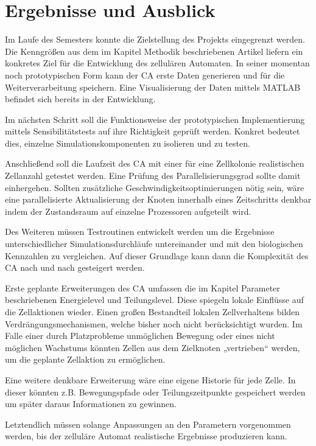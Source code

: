 \documentclass[11pt,a4paper,pointlessnumbers]{scrreprt}  %
\begin{document}
\chapter{Ergebnisse und Ausblick}
Im Laufe des Semesters konnte die Zielstellung des Projekts eingegrenzt werden. Die Kenngrößen aus dem im Kapitel Methodik beschriebenen Artikel liefern ein konkretes Ziel für die Entwicklung des zellulären Automaten. In seiner momentan noch prototypischen Form kann der CA erste Daten generieren und für die Weiterverarbeitung speichern. Eine Visualisierung der Daten mittels MATLAB befindet sich bereits in der Entwicklung. \par 
Im nächsten Schritt soll die Funktionsweise der prototypischen Implementierung mittels Sensibilitätstests auf ihre Richtigkeit geprüft werden. Konkret bedeutet dies, einzelne Simulationskomponenten zu isolieren und zu testen. \par 
Anschließend soll die Laufzeit des CA mit einer für eine Zellkolonie realistischen Zellanzahl getestet werden. Eine Prüfung des Parallelisierungsgrad sollte damit einhergehen. Sollten zusätzliche Geschwindigkeitsoptimierungen nötig sein, wäre eine parallelisierte Aktualisierung der Knoten innerhalb eines Zeitschritts denkbar indem der Zustandsraum auf einzelne Prozessoren aufgeteilt wird. \par 
Des Weiteren müssen Testroutinen entwickelt werden um die Ergebnisse unterschiedlicher Simulationsdurchläufe untereinander und mit den biologischen Kennzahlen zu vergleichen. Auf dieser Grundlage kann dann die Komplexität des CA nach und nach gesteigert werden. \par  
Erste geplante Erweiterungen des CA umfassen die im Kapitel Parameter beschriebenen Energielevel und Teilungslevel. Diese spiegeln lokale Einflüsse auf die Zellaktionen wieder. Einen großen Bestandteil lokalen Zellverhaltens bilden Verdrängungsmechanismen, welche bisher noch nicht berücksichtigt wurden. Im Falle einer durch Platzprobleme unmöglichen Bewegung oder eines nicht möglichen Wachstums könnten Zellen aus dem Zielknoten „vertrieben“ werden, um die geplante Zellaktion zu ermöglichen. \par 

Eine weitere denkbare Erweiterung wäre eine eigene Historie für jede Zelle. In dieser könnten z.B. Bewegungspfade oder Teilungszeitpunkte gespeichert werden um später daraus Informationen zu gewinnen. \par 
Letztendlich müssen solange Anpassungen an den Parametern vorgenommen werden, bis der zelluläre Automat realistische Ergebnisse produzieren kann.

 

\end{document}
